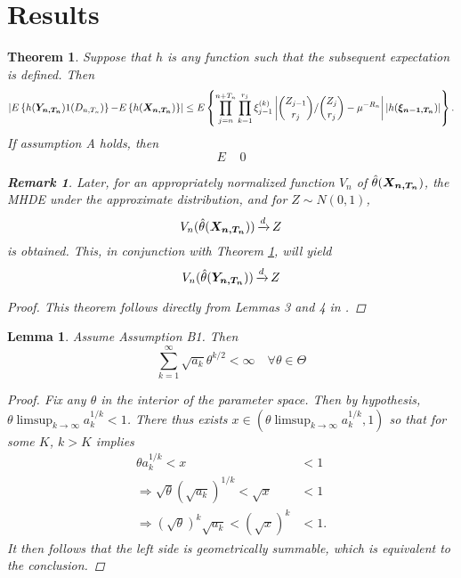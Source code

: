 \documentclass[11 pt]{article}
\newtheorem{lem}{Lemma}
\newtheorem{thm}{Theorem}
\newtheorem{rem}{Remark}
\renewcommand{\th}{\theta}
\newcommand{\xra}[1]{\mathop{ \xrightarrow{#1} }}
\newcommand{\fbr}[1]{ \mathop{ \left\{ #1 \right\} } }
\newcommand{\boldXnt}{\mbox{\boldmath $X_{n,T_n}$}}
\newcommand{\boldYnt}{\mbox{\boldmath $Y_{n,T_n}$}}
\begin{document}
\section{Results}

\begin{thm} 
\label{thm:an}
Suppose that $h$ is any function such that the subsequent expectation is defined. Then
\[
\left | E \fbr{ h(\boldYnt) 1(D_{n,T_n}) } - E \fbr{ h(\boldXnt) } \right | \leq E \fbr{ \prod_{j=n}^{n+T_n} \prod_{k=1}^{r_j} \xi_{j-1}^{(k)} \left | {{Z_{j-1}}\choose{r_j}} / {{Z_j}\choose{r_j}} - \mu^{-R_n} \right | \left | h(\mbox{\boldmath $\xi_{n-1,T_n}$}) \right| }.
\]
If assumption A holds, then
\[
E \fbr{ \prod_{j=n}^{n+T_n} \prod_{k=1}^{r_j} \xi_{j-1}^{(k)} \left | {{Z_{j-1}}\choose{r_j}} / {{Z_j}\choose{r_j}} - \mu^{-R_n} \right | } \xra{n \rightarrow \infty} 0
\]

\begin{rem} Later, for an appropriately normalized function $V_n$ of $\hat{\th}(\boldXnt)$, the MHDE under the approximate distribution, and for $Z \sim N(0,1)$, 
\[
V_n(\hat{\th}(\boldXnt)) \xra{d} Z
\]
is obtained. This, in conjunction with Theorem \ref{thm:an}, will yield
\[
V_n(\hat{\th}(\boldYnt)) \xra{d} Z
\]
\end{rem}

\begin{proof}
This theorem follows directly from Lemmas 3 and 4 in \cite{mm}.
\end{proof}
\end{thm}

\begin{lem}
\label{lem:consistencyintermediate}
Assume Assumption B1. Then 
\[
\sum_{k=1}^{\infty} \sqrt{a_k}\th^{k/2} < \infty \quad \forall \th \in \Theta
\]
\begin{proof}
Fix any $\th$ in the interior of the parameter space. Then by hypothesis, $\th \limsup_{k \rightarrow \infty} a_k^{1/k} < 1$. There thus exists $x \in (\th \limsup_{k \rightarrow \infty} a_k^{1/k},1)$ so that for some $K$, $k > K$ implies
\begin{align*}
\th a_k^{1/k} < x &< 1\\
\Rightarrow \sqrt{\th} (\sqrt{a_k})^{1/k} < \sqrt{x} &< 1 \\
\Rightarrow (\sqrt{\th})^k \sqrt{a_k} < (\sqrt{x})^k &< 1.
\end{align*}
It then follows that the left side is geometrically summable, which is equivalent to the conclusion.
\end{proof}
\end{lem}
\end{document}
